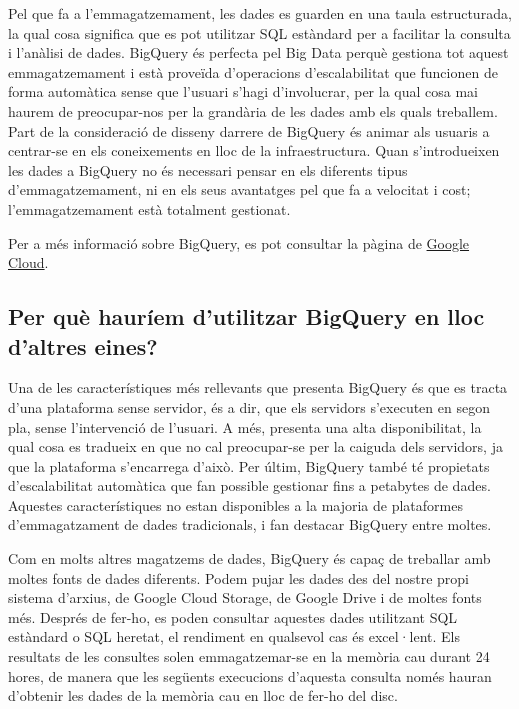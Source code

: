 \documentclass[12pt,longbibliography]{article}
\theoremstyle{definition}
\theoremstyle{remark}
\begin{document}
\vspace{2mm}

Pel que fa a l’emmagatzemament, les dades es guarden en una taula estructurada, la qual cosa significa que es pot utilitzar SQL estàndard per a facilitar la consulta i l’anàlisi de dades. BigQuery és perfecta pel Big Data perquè gestiona tot aquest emmagatzemament i està proveïda d’operacions d’escalabilitat que funcionen de forma automàtica sense que l’usuari s’hagi d’involucrar,  per la qual cosa mai haurem de preocupar-nos per la grandària de les dades amb els quals treballem. Part de la consideració de disseny darrere de BigQuery és animar als usuaris a centrar-se en els coneixements en lloc de la infraestructura. Quan s’introdueixen les dades a BigQuery no és necessari pensar en els diferents tipus d’emmagatzemament, ni en els seus avantatges pel que fa a velocitat i cost; l’emmagatzemament està totalment gestionat.

\vspace{2mm}
\noindent
Per a més informació sobre BigQuery, es pot consultar la pàgina de \href{https://cloud.google.com/bigquery/docs/introduction}{Google Cloud}.

\subsection{Per què hauríem d'utilitzar BigQuery en lloc d'altres eines?}

Una de les característiques més rellevants que presenta BigQuery és que es tracta d'una plataforma sense servidor, és a dir, que els servidors s'executen en segon pla, sense l'intervenció de l'usuari. A més, presenta una alta disponibilitat, la qual cosa es tradueix en que no cal preocupar-se per la caiguda dels servidors, ja que la plataforma s'encarrega d'això. Per últim, BigQuery també té propietats d'escalabilitat automàtica que fan possible gestionar fins a petabytes de dades. Aquestes característiques no estan disponibles a la majoria de plataformes d'emmagatzament de dades tradicionals, i fan destacar BigQuery entre moltes.

\vspace{2mm}

Com en molts altres magatzems de dades, BigQuery és capaç de treballar amb moltes fonts de dades diferents. Podem pujar les dades des del nostre propi sistema d'arxius, de Google Cloud Storage, de Google Drive i de moltes fonts més. Després de fer-ho, es poden consultar aquestes dades utilitzant SQL estàndard o SQL heretat, el rendiment en qualsevol cas és excel·lent. Els resultats de les consultes solen emmagatzemar-se en la memòria cau durant 24 hores, de manera que les següents execucions d'aquesta consulta només hauran d'obtenir les dades de la memòria cau en lloc de fer-ho del disc. 
\end{document}
